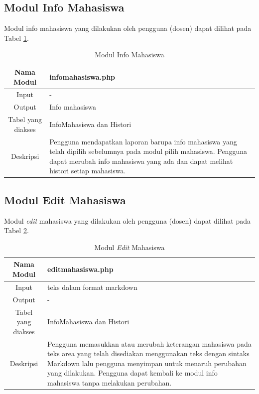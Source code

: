\subsection{Modul Info Mahasiswa}
Modul info mahasiswa yang dilakukan oleh pengguna (dosen) dapat dilihat pada
Tabel \ref{tab:modulinfomahasiswa}.

\begin{table}[h]
\centering
\caption[Tabel Modul Info Mahasiswa]{Modul Info Mahasiswa}
\label{tab:modulinfomahasiswa}
\begin{tabular}{|c|p{7cm}|}
\hline
Nama Modul & infomahasiswa.php\\
\hline
Input & -\\
\hline
Output & Info mahasiswa\\
\hline
Tabel yang diakses & InfoMahasiswa dan Histori\\
\hline
Deskripsi & Pengguna mendapatkan laporan barupa info mahasiswa yang telah
dipilih sebelumnya pada modul pilih mahasiswa. Pengguna dapat merubah info
mahasiswa yang ada dan dapat melihat histori setiap mahasiswa.\\
\hline
\end{tabular}
\end{table}

\subsection{Modul Edit Mahasiswa}
Modul {\it edit} mahasiswa yang dilakukan oleh pengguna (dosen) dapat dilihat
pada Tabel \ref{tab:moduleditmahasiswa}.

\begin{table}[h]
\centering
\caption[Tabel Modul {\it Edit} Mahasiswa]{Modul {\it Edit} Mahasiswa}
\label{tab:moduleditmahasiswa}
\begin{tabular}{|c|p{7cm}|}
\hline
Nama Modul & editmahasiswa.php\\
\hline
Input & teks dalam format markdown\\
\hline
Output & -\\
\hline
Tabel yang diakses & InfoMahasiswa dan Histori\\
\hline
Deskripsi & Pengguna memasukkan atau merubah keterangan mahasiswa pada teks area
yang telah disediakan menggunakan teks dengan sintaks Markdown lalu
pengguna menyimpan untuk menaruh perubahan yang dilakukan. Pengguna dapat
kembali ke modul info mahasiswa tanpa melakukan perubahan.\\
\hline
\end{tabular}
\end{table}

